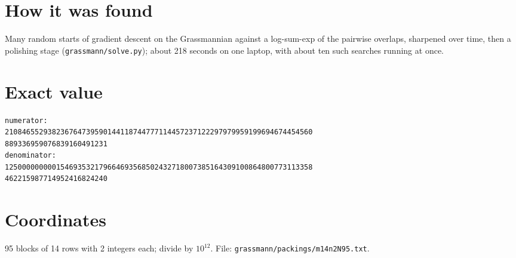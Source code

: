 \documentclass[11pt,a4paper]{article}
\begin{document}
\section{How it was found}
Many random starts of gradient descent on the Grassmannian against a log-sum-exp of the pairwise overlaps, sharpened over time, then a polishing stage (\texttt{grassmann/solve.py}); about 218 seconds on one laptop, with about ten such searches running at once.


\appendix
\section{Exact value}
{\small
\begin{verbatim}
numerator:
210846552938236764739590144118744777114457237122297979959199694674454560
889336959076839160491231
denominator:
125000000000154693532179664693568502432718007385164309100864800773113358
462215987714952416824240
\end{verbatim}}

\section{Coordinates}
95 blocks of 14 rows with 2 integers each; divide by $10^{12}$. File: \texttt{grassmann/packings/m14n2N95.txt}.
{\tiny
\begin{multicols}{4}
\end{multicols}}
\end{document}
